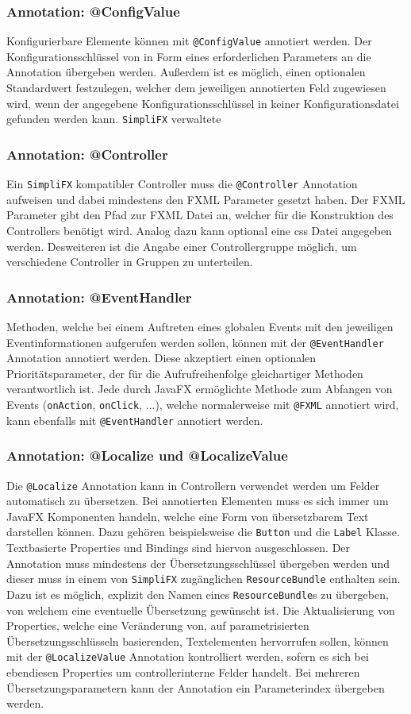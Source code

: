 \subsubsection{Annotation: @ConfigValue}
Konfigurierbare Elemente können mit \texttt{@ConfigValue} annotiert werden. Der Konfigurationsschlüssel von in Form eines erforderlichen Parameters an die Annotation übergeben werden. Außerdem ist es möglich, einen optionalen Standardwert festzulegen, welcher dem jeweiligen annotierten Feld zugewiesen wird, wenn der angegebene Konfigurationsschlüssel in keiner Konfigurationsdatei gefunden werden kann. \texttt{SimpliFX} verwaltete
\subsubsection{Annotation: @Controller}
Ein \texttt{SimpliFX} kompatibler Controller muss die \texttt{@Controller} Annotation aufweisen und dabei mindestens den FXML Parameter gesetzt haben. Der FXML Parameter gibt den Pfad zur FXML Datei an, welcher für die Konstruktion des Controllers benötigt wird. Analog dazu kann optional eine \ac{css} Datei angegeben werden. Desweiteren ist die Angabe einer Controllergruppe möglich, um verschiedene Controller in Gruppen zu unterteilen.
\subsubsection{Annotation: @EventHandler}
Methoden, welche bei einem Auftreten eines globalen Events mit den jeweiligen Eventinformationen aufgerufen werden sollen, können mit der \texttt{@EventHandler} Annotation annotiert werden. Diese akzeptiert einen optionalen Prioritätsparameter, der für die Aufrufreihenfolge gleichartiger Methoden verantwortlich ist. Jede durch JavaFX ermöglichte Methode zum Abfangen von Events (\texttt{onAction}, \texttt{onClick}, ...), welche normalerweise mit \texttt{@FXML} annotiert wird, kann ebenfalls mit \texttt{@EventHandler} annotiert werden.
\subsubsection{Annotation: @Localize und @LocalizeValue}
Die \texttt{@Localize} Annotation kann in Controllern verwendet werden um Felder automatisch zu übersetzen. Bei annotierten Elementen muss es sich immer um JavaFX Komponenten handeln, welche eine Form von übersetzbarem Text darstellen können. Dazu gehören beispielsweise die \texttt{Button} und die \texttt{Label} Klasse. Textbasierte Properties und Bindings sind hiervon ausgeschlossen. Der Annotation muss mindestens der Übersetzungsschlüssel übergeben werden und dieser muss in einem von \texttt{SimpliFX} zugänglichen \texttt{ResourceBundle} enthalten sein. Dazu ist es möglich, explizit den Namen eines \texttt{ResourceBundle}s zu übergeben, von welchem eine eventuelle Übersetzung gewünscht ist. Die Aktualisierung von Properties, welche eine Veränderung von, auf parametrisierten Übersetzungsschlüsseln basierenden, Textelementen hervorrufen sollen, können mit der \texttt{@LocalizeValue} Annotation kontrolliert werden, sofern es sich bei ebendiesen Properties um controllerinterne Felder handelt. Bei mehreren Übersetzungsparametern kann der Annotation ein Parameterindex übergeben werden.
